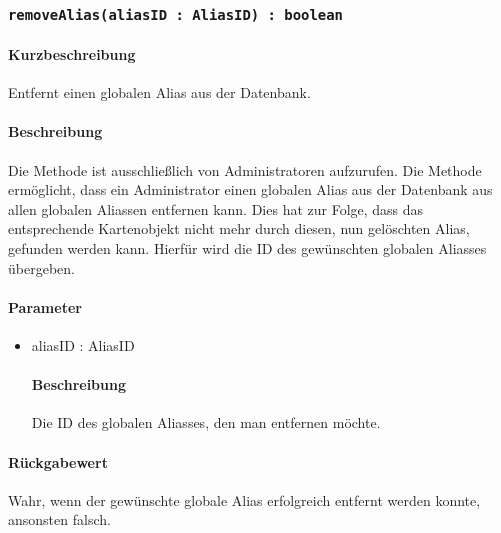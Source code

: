 \subsubsection{\texttt{removeAlias(aliasID : AliasID) : boolean}}%
\paragraph*{Kurzbeschreibung}
Entfernt einen globalen Alias aus der Datenbank.
\paragraph*{Beschreibung}
Die Methode ist ausschließlich von Administratoren aufzurufen.
Die Methode ermöglicht, dass ein Administrator einen globalen Alias aus der Datenbank aus allen globalen Aliassen entfernen kann.
Dies hat zur Folge, dass das entsprechende Kartenobjekt nicht mehr durch diesen, nun gelöschten Alias, gefunden werden kann.
Hierfür wird die ID des gewünschten globalen Aliasses übergeben.
\paragraph*{Parameter}
\begin{itemize}
    \item aliasID : AliasID
    		\paragraph*{Beschreibung}
    		Die ID des globalen Aliasses, den man entfernen möchte.
\end{itemize}
\paragraph*{Rückgabewert}
Wahr, wenn der gewünschte globale Alias erfolgreich entfernt werden konnte, ansonsten falsch.
